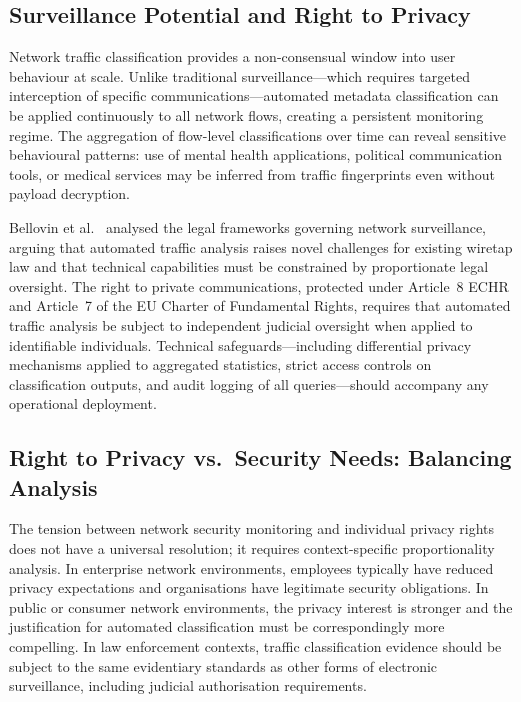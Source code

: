 \documentclass[conference]{IEEEtran}
\begin{document}
\subsection{Surveillance Potential and Right to Privacy}

Network traffic classification provides a non-consensual window into user
behaviour at scale. Unlike traditional surveillance---which requires targeted
interception of specific communications---automated metadata classification can
be applied continuously to all network flows, creating a persistent monitoring
regime. The aggregation of flow-level classifications over time can reveal
sensitive behavioural patterns: use of mental health applications, political
communication tools, or medical services may be inferred from traffic
fingerprints even without payload decryption.

Bellovin et al.\ \cite{bellovin2016} analysed the legal frameworks governing
network surveillance, arguing that automated traffic analysis raises novel
challenges for existing wiretap law and that technical capabilities must be
constrained by proportionate legal oversight.
The right to private communications, protected under Article~8 ECHR and
Article~7 of the EU Charter of Fundamental Rights, requires that automated
traffic analysis be subject to independent judicial oversight when applied to
identifiable individuals. Technical safeguards---including differential privacy
mechanisms applied to aggregated statistics, strict access controls on
classification outputs, and audit logging of all queries---should accompany
any operational deployment.

\subsection{Right to Privacy vs.\ Security Needs: Balancing Analysis}

The tension between network security monitoring and individual privacy rights
does not have a universal resolution; it requires context-specific proportionality
analysis. In enterprise network environments, employees typically have reduced
privacy expectations and organisations have legitimate security obligations.
In public or consumer network environments, the privacy interest is stronger and
the justification for automated classification must be correspondingly more
compelling. In law enforcement contexts, traffic classification evidence should
be subject to the same evidentiary standards as other forms of electronic
surveillance, including judicial authorisation requirements.
\end{document}
